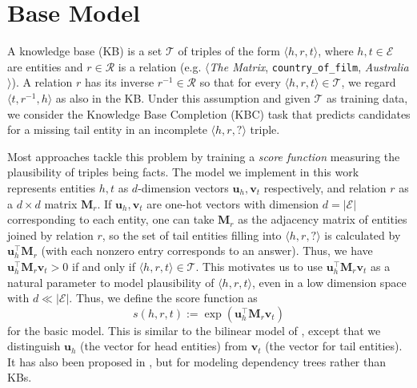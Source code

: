 \documentclass[11pt,a4paper]{article}
\newcommand{\mat}[1]{\bm{#1}}
\renewcommand{\vec}[1]{\bm{#1}}
\newcommand{\setoftriples}{\mathcal{T}}
\newcommand{\setofents}{\mathcal{E}}
\newcommand{\setofrels}{\mathcal{R}}
\begin{document}

\section{Base Model}\label{sec:basemodel}

A knowledge base (KB) is a set $\setoftriples$ of triples of the 
form $\langle h, r, t\rangle$, where 
$h, t\in\setofents$ are entities and $r\in\setofrels$ is a relation 
(e.g. $\langle$\textit{The Matrix}, \texttt{country\_of\_film}, 
\textit{Australia}$\rangle$). A relation $r$ has its inverse 
$r^{-1}\in\setofrels$ so that for every 
$\langle h, r, t\rangle\in\setoftriples$, 
we regard $\langle t, r^{-1}, h \rangle$ as also in the KB. 
Under this assumption and given $\setoftriples$ as training data, 
we consider the Knowledge Base Completion (KBC) task that 
predicts candidates for a missing tail entity in an incomplete 
$\langle h, r, ?\rangle$ triple. 

Most approaches tackle this problem by training a \emph{score function} 
measuring the plausibility of triples being facts. 
The model we implement in this work represents entities 
$h,t$ as $d$-dimension vectors $\vec{u}_h,\vec{v}_t$ respectively, 
and relation $r$ as a $d\times d$ matrix $\mat{M}_r$. If 
$\vec{u}_h,\vec{v}_t$ are one-hot vectors with 
dimension $d=\lvert\setofents\rvert$ corresponding to each entity, 
one can take $\mat{M}_r$ as the adjacency matrix of entities joined by relation $r$, 
so the set of tail entities filling into $\langle h, r, ?\rangle$ is 
calculated by 
$\vec{u}_h^\top \mat{M}_{r}$ (with each nonzero entry corresponds to an answer). 
Thus, we have $\vec{u}_h^\top \mat{M}_{r}\vec{v}_t > 0$ if and only 
if $\langle h, r, t\rangle\in\setoftriples$. This motivates us to use 
$\vec{u}_h^\top \mat{M}_{r}\vec{v}_t$ as a natural parameter to model plausibility 
of $\langle h, r, t\rangle$, even in a 
low dimension space with $d\ll\lvert\setofents\rvert$. 
Thus, we define the score function as 
\begin{equation}\label{eq:scrbilinear}
s(h,r,t):=\exp(\vec{u}_h^\top\mat{M}_{r}\vec{v}_t)
\end{equation}
for the basic model. This is similar to the bilinear model 
of \citet{Nickel:2011:TMC:3104482.3104584}, except that we distinguish 
$\vec{u}_h$ (the vector for head entities) from $\vec{v}_t$ (the vector for tail 
entities). It has also been proposed in \citet{tian-okazaki-inui:2016:P16-1}, but 
for modeling dependency trees rather than KBs. 
\end{document}
